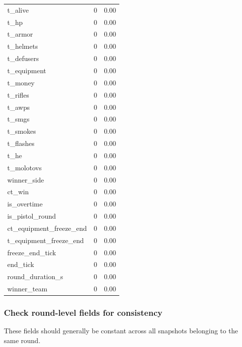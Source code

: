 \documentclass[
  letterpaper,
  DIV=11,
  numbers=noendperiod]{scrartcl}
\begin{document}
{\begin{longtable}[]{@{}lrr@{}}
t\_alive & 0 & 0.00 \\
t\_hp & 0 & 0.00 \\
t\_armor & 0 & 0.00 \\
t\_helmets & 0 & 0.00 \\
t\_defusers & 0 & 0.00 \\
t\_equipment & 0 & 0.00 \\
t\_money & 0 & 0.00 \\
t\_rifles & 0 & 0.00 \\
t\_awps & 0 & 0.00 \\
t\_smgs & 0 & 0.00 \\
t\_smokes & 0 & 0.00 \\
t\_flashes & 0 & 0.00 \\
t\_he & 0 & 0.00 \\
t\_molotovs & 0 & 0.00 \\
winner\_side & 0 & 0.00 \\
ct\_win & 0 & 0.00 \\
is\_overtime & 0 & 0.00 \\
is\_pistol\_round & 0 & 0.00 \\
ct\_equipment\_freeze\_end & 0 & 0.00 \\
t\_equipment\_freeze\_end & 0 & 0.00 \\
freeze\_end\_tick & 0 & 0.00 \\
end\_tick & 0 & 0.00 \\
round\_duration\_s & 0 & 0.00 \\
winner\_team & 0 & 0.00 \\
\end{longtable}
}

\subsubsection{Check round-level fields for
consistency}\label{check-round-level-fields-for-consistency}

These fields should generally be constant across all snapshots belonging
to the same round.
\end{document}
